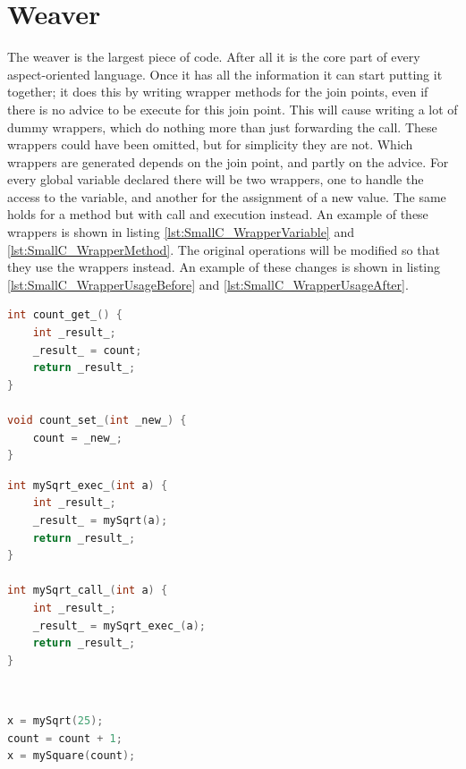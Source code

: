 \documentclass[a4paper]{report}
\begin{document}
\section{Weaver}
The weaver is the largest piece of code. After all it is the core part of every aspect-oriented language. Once it has all the information it can start putting it together; it does this by writing wrapper methods for the join points, even if there is no advice to be execute for this join point. This will cause writing a lot of dummy wrappers, which do nothing more than just forwarding the call. These wrappers could have been omitted, but for simplicity they are not. Which wrappers are generated depends on the join point, and partly on the advice. For every global variable declared there will be two wrappers, one to handle the access to the variable, and another for the assignment of a new value. The same holds for a method but with call and execution instead. An example of these wrappers is shown in listing \ref{lst:SmallC_WrapperVariable} and \ref{lst:SmallC_WrapperMethod}. The original operations will be modified so that they use the wrappers instead. An example of these changes is shown in listing \ref{lst:SmallC_WrapperUsageBefore} and \ref{lst:SmallC_WrapperUsageAfter}.\\
\begin{minipage}{0.45\textwidth}
\begin{lstlisting}[language=C, caption=Example of variable wrappers, label=lst:SmallC_WrapperVariable]
int count_get_() {
	int _result_;
	_result_ = count;
	return _result_;
}

void count_set_(int _new_) {
	count = _new_;
}
\end{lstlisting}
\end{minipage}\hfill
\begin{minipage}{0.45\textwidth}
\begin{lstlisting}[language=C, caption=Example of method wrappers, label=lst:SmallC_WrapperMethod]
int mySqrt_exec_(int a) {
	int _result_;
	_result_ = mySqrt(a);
	return _result_;
}

int mySqrt_call_(int a) {
	int _result_;
	_result_ = mySqrt_exec_(a);
	return _result_;
}
\end{lstlisting}
\end{minipage}\\
\begin{minipage}{0.45\textwidth}
\begin{lstlisting}[language=C, caption=Example of code before weaving, label=lst:SmallC_WrapperUsageBefore]
x = mySqrt(25);
count = count + 1;
x = mySquare(count);
\end{lstlisting}
\end{minipage}\hfill
\end{document}
